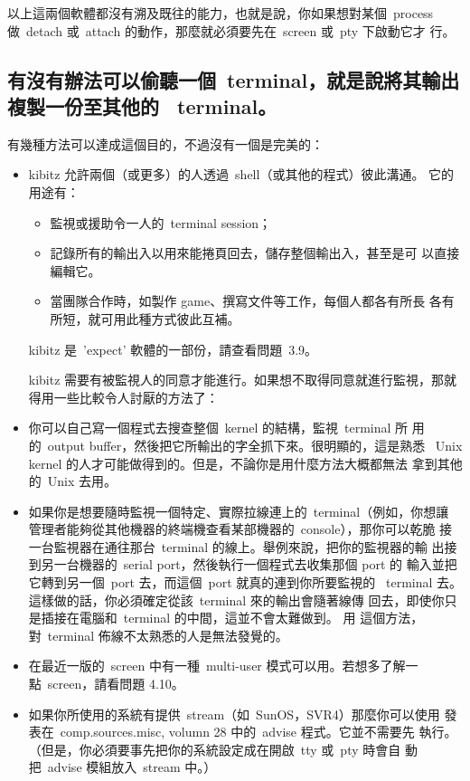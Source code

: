 \documentclass{article}
\begin{document}
\begin{CJK*}{Bg5}{ming}
	以上這兩個軟體都沒有溯及既往的能力，也就是說，你如果想對某個~process
        做~detach 或~attach 的動作，那麼就必須要先在~screen 或~pty 下啟動它才
        行。

\subsection{有沒有辦法可以偷聽一個~terminal，就是說將其輸出複製一份至其他的 
     ~terminal。}

	有幾種方法可以達成這個目的，不過沒有一個是完美的：
\begin{itemize}
	\item  kibitz 允許兩個（或更多）的人透過~shell（或其他的程式）彼此溝通。
           它的用途有：
	   \begin{itemize}
		\item  監視或援助令一人的~terminal session；
		\item  記錄所有的輸出入以用來能捲頁回去，儲存整個輸出入，甚至是可
                   以直接編輯它。
		\item  當團隊合作時，如製作 game、撰寫文件等工作，每個人都各有所長
                   各有所短，就可用此種方式彼此互補。
	   \end{itemize}
	kibitz 是~'expect' 軟體的一部份，請查看問題~3.9。

	kibitz 需要有被監視人的同意才能進行。如果想不取得同意就進行監視，那就
        得用一些比較令人討厭的方法了：

	\item  你可以自己寫一個程式去搜查整個~kernel 的結構，監視~terminal 所
	   用的~output buffer，然後把它所輸出的字全抓下來。很明顯的，這是熟悉
	   ~Unix kernel 的人才可能做得到的。但是，不論你是用什麼方法大概都無法
           拿到其他的~Unix 去用。

	\item 如果你是想要隨時監視一個特定、實際拉線連上的~terminal（例如，你想讓
	   管理者能夠從其他機器的終端機查看某部機器的~console），那你可以乾脆
           接一台監視器在通往那台~terminal 的線上。舉例來說，把你的監視器的輸
           出接到另一台機器的~serial port，然後執行一個程式去收集那個 port 的
           輸入並把它轉到另一個~port 去，而這個~port 就真的連到你所要監視的 
          ~terminal 去。這樣做的話，你必須確定從該~terminal 來的輸出會隨著線傳
           回去，即使你只是插接在電腦和~terminal 的中間，這並不會太難做到。 用
           這個方法，對~terminal 佈線不太熟悉的人是無法發覺的。

	\item  在最近一版的~screen 中有一種~multi-user 模式可以用。若想多了解一
           點~screen，請看問題 4.10。

	\item  如果你所使用的系統有提供~stream（如~SunOS，SVR4）那麼你可以使用
	   發表在~comp.sources.misc, volumn 28 中的~advise 程式。它並不需要先
           執行。（但是，你必須要事先把你的系統設定成在開啟~tty 或~pty 時會自
           動把~advise 模組放入~stream 中。）
\end{itemize}

\end{CJK*}
\end{document}

